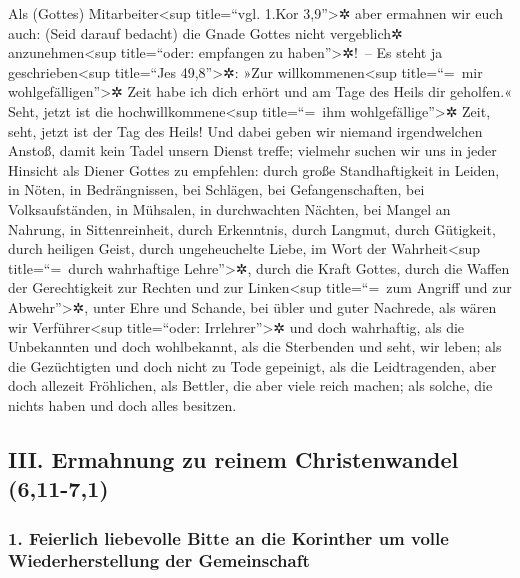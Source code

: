  Als (Gottes) Mitarbeiter\textless sup title=``vgl. 1.Kor
3,9''\textgreater✲ aber ermahnen wir euch auch: (Seid darauf bedacht)
die Gnade Gottes nicht vergeblich✲ anzunehmen\textless sup title=``oder:
empfangen zu haben''\textgreater✲!~--  Es steht ja
geschrieben\textless sup title=``Jes 49,8''\textgreater✲: »Zur
willkommenen\textless sup title=``=~mir wohlgefälligen''\textgreater✲
Zeit habe ich dich erhört und am Tage des Heils dir geholfen.« Seht,
jetzt ist die hochwillkommene\textless sup title=``=~ihm
wohlgefällige''\textgreater✲ Zeit, seht, jetzt ist der Tag des Heils!
 Und dabei geben wir niemand irgendwelchen Anstoß, damit
kein Tadel unsern Dienst treffe;  vielmehr suchen wir uns
in jeder Hinsicht als Diener Gottes zu empfehlen: durch große
Standhaftigkeit in Leiden, in Nöten, in Bedrängnissen, 
bei Schlägen, bei Gefangenschaften, bei Volksaufständen, in Mühsalen, in
durchwachten Nächten, bei Mangel an Nahrung,  in
Sittenreinheit, durch Erkenntnis, durch Langmut, durch Gütigkeit, durch
heiligen Geist, durch ungeheuchelte Liebe,  im Wort der
Wahrheit\textless sup title=``=~durch wahrhaftige Lehre''\textgreater✲,
durch die Kraft Gottes, durch die Waffen der Gerechtigkeit zur Rechten
und zur Linken\textless sup title=``=~zum Angriff und zur
Abwehr''\textgreater✲,  unter Ehre und Schande, bei übler
und guter Nachrede, als wären wir Verführer\textless sup title=``oder:
Irrlehrer''\textgreater✲ und doch wahrhaftig,  als die
Unbekannten und doch wohlbekannt, als die Sterbenden und seht, wir
leben; als die Gezüchtigten und doch nicht zu Tode gepeinigt,
 als die Leidtragenden, aber doch allezeit Fröhlichen,
als Bettler, die aber viele reich machen; als solche, die nichts haben
und doch alles besitzen.

\hypertarget{iii.-ermahnung-zu-reinem-christenwandel-611-71}{%
\subsection{III. Ermahnung zu reinem Christenwandel
(6,11-7,1)}\label{iii.-ermahnung-zu-reinem-christenwandel-611-71}}

\hypertarget{feierlich-liebevolle-bitte-an-die-korinther-um-volle-wiederherstellung-der-gemeinschaft}{%
\subsubsection{1. Feierlich liebevolle Bitte an die Korinther um volle
Wiederherstellung der
Gemeinschaft}\label{feierlich-liebevolle-bitte-an-die-korinther-um-volle-wiederherstellung-der-gemeinschaft}}

